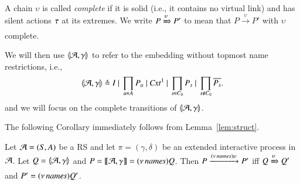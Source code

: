 \begin{definition}
A chain $\upsilon$ is called \emph{complete} if it is solid (i.e., it contains no virtual link) and has silent actions $\tau$ at its extremes.
We  write $P\xRightarrow{\upsilon} P'$ to mean that $P\xrightarrow{\upsilon} P'$ with $\upsilon$ complete.
\end{definition}

We will then use $\llparenthesis{\cal A},\gamma\rrparenthesis$ to refer to the 
{\color{red} embedding}
without topmost name restrictions, i.e.,
$$
\llparenthesis{\cal A},\gamma\rrparenthesis \triangleq 
I~|~ \prod_{a\in A} P_a ~|~  \mathit{Cxt}^1~|~\prod_{s\in C_0}P_{s} ~|~ \prod_{s \notin C_0}\overline{P_s} .
$$
and we will focus on the complete transitions of $\llparenthesis{\cal A},\gamma\rrparenthesis$.

The following Corollary immediately follows from Lemma~\ref{lem:struct}.

\begin{corollary}
Let ${\cal A} = (S, A)$ be a RS and let $\pi=(\gamma,\delta)$ be an extended  interactive process in ${\cal A}$. 
Let $Q=\llparenthesis{\cal A},\gamma\rrparenthesis$ and $P= \llbracket{\cal A},\gamma\rrbracket = (\nu\, \mathit{names})Q$. 
Then $P \xrightarrow{(\nu\, \mathit{names})\upsilon} P'$ iff $Q \xRightarrow{\upsilon} Q'$ and $P'=(\nu\, \mathit{names})Q'$.
\end{corollary}


